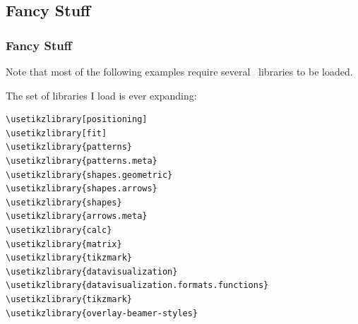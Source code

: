 \subsection{Fancy Stuff}
\begin{frame}[fragile]
  \frametitle{Fancy Stuff}
  \vspace{3mm}
  Note that most of the following examples require several \TikZ\ libraries to be loaded.
  
  \pause
  \vspace{5mm}
  The set of libraries I load is ever expanding:
  \begin{verbatim}
\usetikzlibrary[positioning]
\usetikzlibrary[fit]
\usetikzlibrary{patterns}
\usetikzlibrary{patterns.meta}
\usetikzlibrary{shapes.geometric}
\usetikzlibrary{shapes.arrows}
\usetikzlibrary{shapes}
\usetikzlibrary{arrows.meta}
\usetikzlibrary{calc}
\usetikzlibrary{matrix}
\usetikzlibrary{tikzmark}
\usetikzlibrary{datavisualization}
\usetikzlibrary{datavisualization.formats.functions}
\usetikzlibrary{tikzmark}
\usetikzlibrary{overlay-beamer-styles}
  \end{verbatim}
\end{frame}

